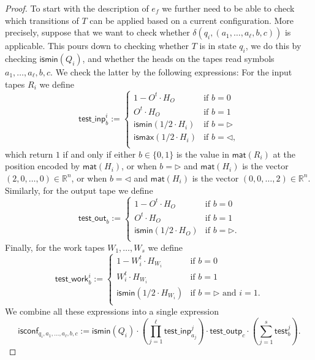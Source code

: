 \begin{proof}
To start with the description of $e_f$ we further need to be able to check which transitions of $T$ can be applied based on a current configuration. More precisely,
suppose that we want to check whether $\delta(q_i,(a_1,\ldots,a_{\ell},b,c))$ is applicable.
This pours down to checking whether $T$ is in state $q_i$, we do this by checking 
$\mathsf{ismin}(Q_i)$, and whether the heads on the tapes read symbols $a_1,\ldots,a_{\ell},b,c$. We check the latter by the following expressions:
For the input tapes $R_i$ we define
$$
\mathsf{test\_inp}^i_b:=\begin{cases}
1- O^t\cdot H_O & \text{if $b=0$}\\
O^t\cdot H_O & \text{if $b=1$}\\
\mathsf{ismin}(1/2\cdot H_i) & \text{if $b=\rhd$}\\
\mathsf{ismax}(1/2\cdot H_i) & \text{if $b=\lhd$},\\
\end{cases}
$$
which return $1$ if and only if either $b\in\{0,1\}$ is the value in $\mathsf{mat}(R_i)$ at the position encoded by $\mathsf{mat}(H_i)$, or when $b=\rhd$ and $\mathsf{mat}(H_i)$ is the vector $(2,0,\ldots,0)\in\mathbb{R}^n$, or when $b=\lhd$ and $\mathsf{mat}(H_i)$ is the vector $(0,0,\ldots,2)\in\mathbb{R}^n$. Similarly, for the output tape we define
$$
\mathsf{test\_out}_b:=\begin{cases}
1- O^t\cdot H_O & \text{if $b=0$}\\
O^t\cdot H_O & \text{if $b=1$}\\
\mathsf{ismin}(1/2\cdot H_O) & \text{if $b=\rhd$}.\\
\end{cases}
$$
Finally, for the work tapes $W_1,\ldots,W_s$ we define
$$
\mathsf{test\_work}^i_b:=\begin{cases}
1- W_i^t\cdot H_{W_i} & \text{if $b=0$}\\
W_i^t\cdot H_{W_i} & \text{if $b=1$}\\
\mathsf{ismin}(1/2\cdot H_{W_i}) & \text{if $b=\rhd$ and $i=1$}.\\
\end{cases}
$$
We combine all these expressions into a single expression 
$$
\mathsf{isconf}_{q_i,a_1,\ldots,a_\ell,b,c}:=
\mathsf{ismin}(Q_i)\cdot \left(\prod_{j=1}^{\ell} \mathsf{test\_inp}_{a_j}^j\right)
\cdot\mathsf{test\_outp}_{c}\cdot\left(\sum_{j=1}^s \mathsf{test}_b^j\right).
$$

\end{proof}
